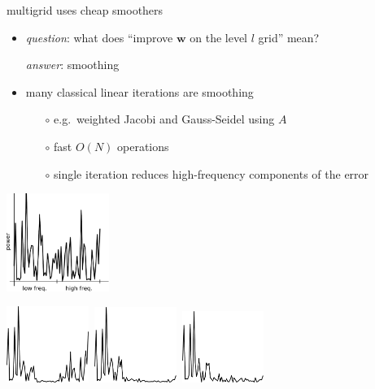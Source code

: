 \documentclass[hide notes,intlimits,usenames,dvipsnames]{beamer}
\newcommand{\bw}{\mathbf{w}}
\begin{document}
\begin{frame}{multigrid uses cheap smoothers}

\begin{itemize}
\item \emph{question}: what does ``improve $\bw$ on the level $l$ grid'' mean?

\emph{answer}: \alert{smoothing}
\item many classical linear iterations are smoothing
	\begin{itemize}
	\item[$\circ$] e.g.~weighted Jacobi and Gauss-Seidel using $A$
	\item[$\circ$] fast $O(N)$ operations
	\item[$\circ$] single iteration reduces high-frequency components of the error
	\end{itemize}
\end{itemize}

\begin{center}
\includegraphics[width=0.25\textwidth]{figs/ps-unsmoothed}

\vspace{-3mm}


\mbox{\includegraphics[width=0.2\textwidth]{figs/ps-jacobismoothed} \qquad
\includegraphics[width=0.2\textwidth]{figs/ps-wjacobismoothed} \qquad
\includegraphics[width=0.2\textwidth]{figs/ps-gssmoothed}}
\end{center}
\end{frame}
\end{document}
